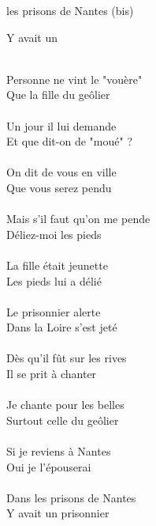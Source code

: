 \begin{SBVerse*}
 les prisons de Nantes  (bis)

Y avait un 
\end{SBVerse*}
~\\
Personne ne vint le "vouère"\\
Que la fille du geôlier\\
~\\
Un jour il lui demande\\
Et que dit-on de "moué" ?\\
~\\
On dit de vous en ville\\
Que vous serez pendu\\
~\\
Mais s'il faut qu'on me pende\\
Déliez-moi les pieds\\
~\\
La fille était jeunette\\
Les pieds lui a délié\\
~\\
Le prisonnier alerte\\
Dans la Loire s'est jeté\\
~\\
Dès qu'il fût sur les rives\\
Il se prit à chanter\\
~\\
Je chante pour les belles\\
Surtout celle du geôlier\\
~\\
Si je reviens à Nantes\\
Oui je l'épouserai\\
~\\
Dans les prisons de Nantes\\
Y avait un prisonnier\\
~\\
